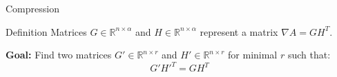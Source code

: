 \begin{frame}{Compression}

  \begin{block}{Definition}
    Matrices $G \in \mathbb{R}^{n \times \alpha}$ and $H \in
    \mathbb{R}^{n \times \alpha}$ represent a matrix $\nabla A = G H^T$.
    \vspace{0.5em}

    \textbf{Goal:} Find two matrices $G' \in \mathbb{R}^{n \times r}$
    and $H' \in \mathbb{R}^{n \times r}$ for minimal $r$ such that:
    \[
      G'H'^T = G H^T
    \]
  \end{block}

\end{frame}
